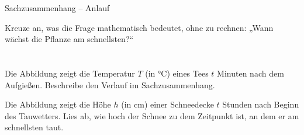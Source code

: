 \begin{aufgabe}{Sachzusammenhang – Anlauf}
\begin{teile}
\teil Kreuze an, was die Frage mathematisch bedeutet, ohne zu rechnen: „Wann wächst die Pflanze am schnellsten?“ \\  \\  \\ 
\teil Die Abbildung zeigt die Temperatur $T$ (in °C) eines Tees $t$ Minuten nach dem Aufgießen. Beschreibe den Verlauf im Sachzusammenhang.

\begin{ksys}[xmin=0,xmax=40,ymin=0,ymax=100,xstep=10,ystep=20,xlabel=t in min,ylabel=T in °C,ablesen]  \end{ksys}
\teil Die Abbildung zeigt die Höhe $h$ (in cm) einer Schneedecke $t$ Stunden nach Beginn des Tauwetters. Lies ab, wie hoch der Schnee zu dem Zeitpunkt ist, an dem er am schnellsten taut.

\begin{ksys}[xmin=0,xmax=20,ymin=0,ymax=50,xstep=5,ystep=5,xlabel=t in h,ylabel=h in cm,ablesen]  \end{ksys}
\end{teile}
\end{aufgabe}

